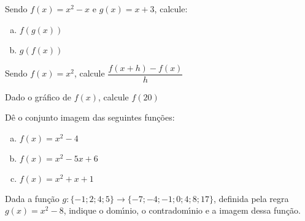 

\pagestyle{empty}


\begin{prob}
Sendo $f\left( x\right) = x^{2}-x$ e $g\left( x\right) = x+3$, calcule:
\begin{multicols}{2}
\begin{enumerate}[(a)]
\item    $f\left( g\left( x\right) \right) $
\item    $g\left( f\left( x\right) \right) $
\end{enumerate}
\end{multicols}
\end{prob}

\begin{prob}
Sendo $f\left( x\right) = x^{2}$, calcule $\dfrac{f\left( x+h\right) -f\left( x\right) }{h}$
\end{prob}

\begin{prob}
Dado o gr\'{a}fico de $f\left( x\right)$, calcule $f\left( 20\right)$


\end{prob}

\begin{prob}
D\^{e} o conjunto imagem das seguintes fun\c{c}\~{o}es:
\begin{multicols}{3}
\begin{enumerate}[(a)]
\item    $f\left( x\right) =x^{2}-4$
\item    $f\left( x\right) =x^{2}-5x+6$
\item    $f\left( x\right) =x^{2}+x+1$
\end{enumerate}
\end{multicols}
\end{prob}

\begin{prob}
Dada a fun\c{c}\~{a}o $g:\{ -1;2;4;5\} \rightarrow \{-7;-4;-1;0;4;8;17\}$, definida pela regra $g(x)=x^{2}-8$, indique o dom\'{\i}nio, o contradom\'{\i}nio e a imagem dessa fun\c{c}\~{a}o.
\end{prob}

